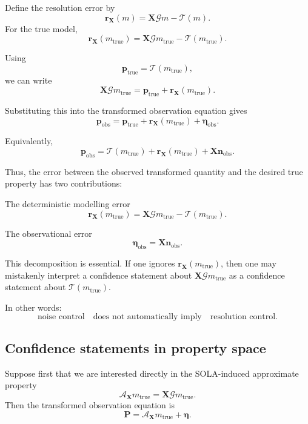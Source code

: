 \documentclass[11pt]{article}
\newcommand{\Prand}{\mathbf P}
\newcommand{\nobs}{\mathbf n_{\mathrm{obs}}}
\newcommand{\ptrue}{\mathbf p_{\mathrm{true}}}
\newcommand{\pobs}{\mathbf p_{\mathrm{obs}}}
\newcommand{\G}{\mathcal G}
\newcommand{\Tau}{\mathcal T}
\newcommand{\X}{\mathbf X}
\newcommand{\A}{\mathcal A}
\newcommand{\etarand}{\boldsymbol{\eta}}
\begin{document}
Define the resolution error by
\[
    \mathbf r_{\X}(m)
    =
    \X\G m-\Tau(m).
\]
For the true model,
\[
    \mathbf r_{\X}(m_{\mathrm{true}})
    =
    \X\G m_{\mathrm{true}}
    -
    \Tau(m_{\mathrm{true}}).
\]

Using
\[
    \ptrue=\Tau(m_{\mathrm{true}}),
\]
we can write
\[
    \X\G m_{\mathrm{true}}
    =
    \ptrue+\mathbf r_{\X}(m_{\mathrm{true}}).
\]

Substituting this into the transformed observation equation gives
\[
    \pobs
    =
    \ptrue
    +
    \mathbf r_{\X}(m_{\mathrm{true}})
    +
    \etarand_{\mathrm{obs}}.
\]

Equivalently,
\[
    \pobs
    =
    \Tau(m_{\mathrm{true}})
    +
    \mathbf r_{\X}(m_{\mathrm{true}})
    +
    \X\nobs.
\]

Thus, the error between the observed transformed quantity and the desired true property has two contributions:
\begin{description}[leftmargin=3.2cm,style=nextline]
    \item[Resolution error.]
    The deterministic modelling error
    \[
        \mathbf r_{\X}(m_{\mathrm{true}})
        =
        \X\G m_{\mathrm{true}}-\Tau(m_{\mathrm{true}}).
    \]

    \item[Transformed noise.]
    The observational error
    \[
        \etarand_{\mathrm{obs}}
        =
        \X\nobs.
    \]
\end{description}

This decomposition is essential. If one ignores \(\mathbf r_{\X}(m_{\mathrm{true}})\), then one may mistakenly interpret a confidence statement about \(\X\G m_{\mathrm{true}}\) as a confidence statement about \(\Tau(m_{\mathrm{true}})\).

In other words:
\[
    \text{noise control}
    \quad
    \text{does not automatically imply}
    \quad
    \text{resolution control}.
\]

\subsection{Confidence statements in property space}

Suppose first that we are interested directly in the SOLA-induced approximate property
\[
    \A_{\X}m_{\mathrm{true}}
    =
    \X\G m_{\mathrm{true}}.
\]
Then the transformed observation equation is
\[
    \Prand
    =
    \A_{\X}m_{\mathrm{true}}
    +
    \etarand.
\]
\end{document}
